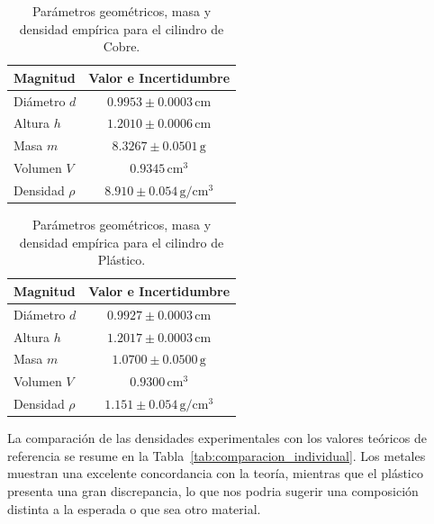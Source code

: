 \documentclass[10pt, letterpaper, twocolumn]{article}
\begin{document}
\begin{table}[htbp]
    \centering
    \caption{Parámetros geométricos, masa y densidad empírica para el cilindro de Cobre.}
    \label{tab:cil_cobre}
    \begin{tabular}{lc}
        \toprule
        \textbf{Magnitud} & \textbf{Valor e Incertidumbre} \\
        \midrule
        Diámetro $d$ & $0.9953 \pm 0.0003\,\mathrm{cm}$ \\
        Altura $h$ & $1.2010 \pm 0.0006\,\mathrm{cm}$ \\
        Masa $m$ & $8.3267 \pm 0.0501\,\mathrm{g}$ \\
        Volumen $V$ & $0.9345\,\mathrm{cm^3}$ \\
        Densidad $\rho$ & $8.910 \pm 0.054\,\mathrm{g/cm^3}$ \\
        \bottomrule
    \end{tabular}
\end{table}

\begin{table}[htbp]
    \centering
    \caption{Parámetros geométricos, masa y densidad empírica para el cilindro de Plástico.}
    \label{tab:cil_plastico}
    \begin{tabular}{lc}
        \toprule
        \textbf{Magnitud} & \textbf{Valor e Incertidumbre} \\
        \midrule
        Diámetro $d$ & $0.9927 \pm 0.0003\,\mathrm{cm}$ \\
        Altura $h$ & $1.2017 \pm 0.0003\,\mathrm{cm}$ \\
        Masa $m$ & $1.0700 \pm 0.0500\,\mathrm{g}$ \\
        Volumen $V$ & $0.9300\,\mathrm{cm^3}$ \\
        Densidad $\rho$ & $1.151 \pm 0.054\,\mathrm{g/cm^3}$ \\
        \bottomrule
    \end{tabular}
\end{table}
La comparación de las densidades experimentales con los valores teóricos de referencia se resume en la Tabla~\ref{tab:comparacion_individual}. Los metales muestran una excelente concordancia con la teoría, mientras que el plástico presenta una gran discrepancia, lo que nos podria sugerir una composición distinta a la esperada o que sea otro material.
\end{document}
